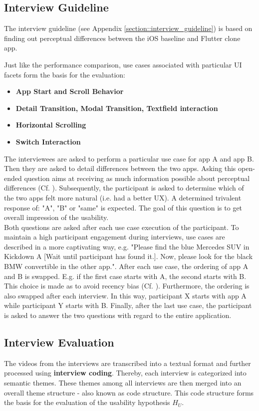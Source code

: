 \subsection{Interview Guideline} \label{subsection::interview_guideline}
The interview guideline (see Appendix \ref{section::interview_guideline}) is based on finding out perceptual differences between the iOS baseline and Flutter clone app.

Just like the performance comparison, use cases associated with particular UI facets form the basis for the evaluation:
\begin{itemize}
    \item \textbf{App Start and Scroll Behavior}
    \item \textbf{Detail Transition, Modal Transition, Textfield interaction}
    \item \textbf{Horizontal Scrolling}
    \item \textbf{Switch Interaction}
\end{itemize}
The interviewees are asked to perform a particular use case for app A and app B. Then they are asked to detail differences between the two apps.
Asking this open-ended question aims at receiving as much information possible about perceptual differences (Cf. \cite[182--185]{Helferrich2011}).
Subsequently, the participant is asked to determine which of the two apps felt more natural (i.e. had a better UX). A determined trivalent response of: "A", "B" or "same" is expected. 
The goal of this question is to get overall impression of the usability. \\
Both questions are asked after each use case execution of the participant. 
To maintain a high participant engagement during interviews, use cases are described in a more captivating way, e.g. "Please find the blue Mercedes SUV in Kickdown A [Wait until participant has found it.]. Now, 
please look for the black BMW convertible in the other app.". 
After each use case, the ordering of app A and B is swapped. E.g. if the first case starts with A, the second starts with B. This choice is made as to avoid recency bias (Cf. \cite{Atkinson1968}).
Furthermore, the ordering is also swapped after each interview. In this way, participant X starts with app A while participant Y starts with B.
Finally, after the last use case, the participant is asked to answer the two questions with regard to the entire application.


\subsection{Interview Evaluation} \label{section::interview_evaluation}
The videos from the interviews are transcribed into a textual format and further processed using \textbf{interview coding}. Thereby, each interview is categorized into semantic themes. These themes among
all interviews are then merged into an overall theme structure - also known as code structure. This code structure forms the basis for the evaluation of the usability hypothesis $H_U$. 
